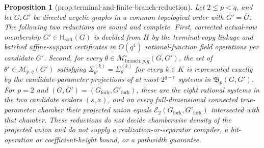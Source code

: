 \documentclass{article}
\newtheorem{proposition}{Proposition}
\begin{document}
\begin{proposition}[prop:terminal-and-finite-branch-reduction]\label{prop:terminal-and-finite-branch-reduction}
Let \(2\le p<q\), and let \(G,G'\) be directed acyclic graphs in a common topological order with \(\overline{G'}=\overline G\).  The following two reductions are sound and complete.  First, corrected actual-row membership \(G'\in\mathsf H_{\mathrm{soft}}(G)\) is decided from \(H\) by the terminal-copy linkage and batched affine-support certificates in \(O(q^4)\) rational-function field operations per candidate \(G'\).  Second, for every \(\theta\in\mathcal M^{\circ}_{\mathrm{branch},p,q}(G,G')\), the set of \(\theta'\in\mathcal M_{p,q}(G')\) satisfying \(\Sigma_{\theta'}^{(k)}=\Sigma_{\theta}^{(k)}\) for every \(k\in K\) is represented exactly by the candidate-parameter projections of at most \(2^{q-r}\) systems in \(\mathfrak B_p(G,G')\).  For \(p=2\) and \((G,G')=(G_{\mathrm{fork}},G'_{\mathrm{fork}})\), these are the eight rational systems in the two candidate scalars \((s,x)\), and on every full-dimensional connected true-parameter chamber their projected union equals \(\mathcal E_2(G_{\mathrm{fork}},G'_{\mathrm{fork}})\) intersected with that chamber.  These reductions do not decide chamberwise density of the projected union and do not supply a realization-or-separator compiler, a bit-operation or coefficient-height bound, or a pathwidth guarantee.
\end{proposition}
\end{document}
